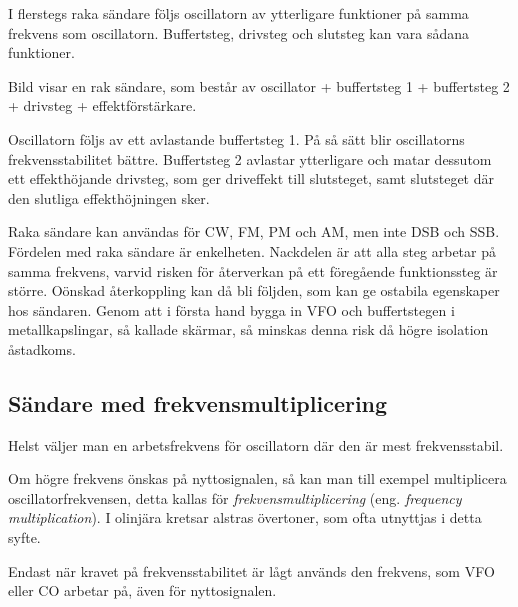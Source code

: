 I flerstegs raka sändare följs oscillatorn av ytterligare funktioner på samma
frekvens som oscillatorn.
Buffertsteg, drivsteg och slutsteg kan vara sådana funktioner.

Bild  visar en rak sändare, som består av oscillator +
buffertsteg 1 + buffertsteg 2 + drivsteg + effektförstärkare.

Oscillatorn följs av ett avlastande buffertsteg 1.
På så sätt blir oscillatorns frekvensstabilitet bättre.
Buffertsteg 2 avlastar ytterligare och matar dessutom ett effekthöjande
drivsteg, som ger driveffekt till slutsteget, samt slutsteget där den slutliga
effekthöjningen sker.

Raka sändare kan användas för CW, FM, PM och AM, men inte DSB och SSB.
Fördelen med raka sändare är enkelheten.
Nackdelen är att alla steg arbetar på samma frekvens, varvid risken för
återverkan på ett föregående funktionssteg är större.
Oönskad återkoppling kan då bli följden, som kan ge ostabila egenskaper hos
sändaren.
Genom att i första hand bygga in VFO och buffertstegen i metallkapslingar,
så kallade skärmar, så minskas denna risk då högre isolation åstadkoms.

\subsection{Sändare med frekvensmultiplicering}

Helst väljer man en arbetsfrekvens för oscillatorn där den är mest
frekvensstabil.

Om högre frekvens önskas på nyttosignalen, så kan man
till exempel multiplicera oscillatorfrekvensen, detta kallas för
\emph{frekvensmultiplicering} (eng. \emph{frequency multiplication}).
I olinjära kretsar alstras övertoner, som ofta utnyttjas i detta syfte.

Endast när kravet på frekvensstabilitet är lågt används den frekvens,
som VFO eller CO arbetar på, även för nyttosignalen.


